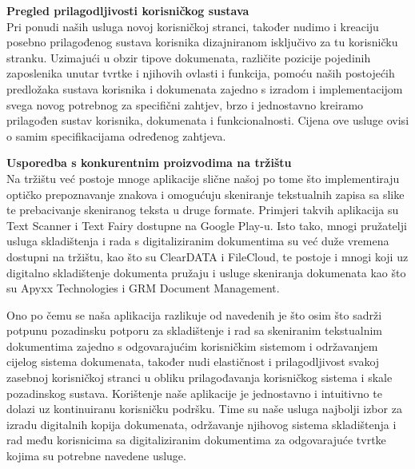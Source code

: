 		\medskip
		\textbf{Pregled prilagodljivosti korisničkog sustava}
			\\
		Pri ponudi naših usluga novoj korisničkoj stranci, također nudimo i kreaciju posebno prilagođenog sustava korisnika dizajniranom isključivo za tu korisničku stranku. Uzimajući u obzir tipove dokumenata, različite pozicije pojedinih zaposlenika unutar tvrtke i njihovih ovlasti i funkcija, pomoću naših postojećih predložaka sustava korisnika i dokumenata zajedno s izradom i implementacijom svega novog potrebnog za specifični zahtjev, brzo i jednostavno kreiramo prilagođen sustav korisnika, dokumenata i funkcionalnosti. Cijena ove usluge ovisi o samim specifikacijama određenog zahtjeva.
		


		
		\medskip
		\textbf{Usporedba s konkurentnim proizvodima na tržištu}
			\\
		Na tržištu već postoje mnoge aplikacije slične našoj po tome što implementiraju optičko prepoznavanje znakova i omogućuju skeniranje tekstualnih zapisa sa slike te prebacivanje skeniranog teksta u druge formate. Primjeri takvih aplikacija su Text Scanner i Text Fairy dostupne na Google Play-u. Isto tako, mnogi pružatelji usluga skladištenja i rada s digitaliziranim dokumentima su već duže vremena dostupni na tržištu, kao što su ClearDATA i FileCloud, te postoje i mnogi koji uz digitalno skladištenje dokumenta pružaju i usluge skeniranja dokumenata kao što su Apyxx Technologies i GRM Document Management.
			
		Ono po čemu se naša aplikacija razlikuje od navedenih je što osim što sadrži potpunu pozadinsku potporu za skladištenje i rad sa skeniranim tekstualnim dokumentima zajedno s odgovarajućim korisničkim sistemom i održavanjem cijelog sistema dokumenata, također nudi elastičnost i prilagodljivost svakoj zasebnoj korisničkoj stranci u obliku prilagođavanja korisničkog sistema i skale pozadinskog sustava. Korištenje naše aplikacije je jednostavno i intuitivno te dolazi uz kontinuiranu korisničku podršku. Time su naše usluga najbolji izbor za izradu digitalnih kopija dokumenata, održavanje njihovog sistema skladištenja i rad među korisnicima sa digitaliziranim dokumentima za odgovarajuće tvrtke kojima su potrebne navedene usluge.
		
		
		
		
		
		\eject
		
		
		
	